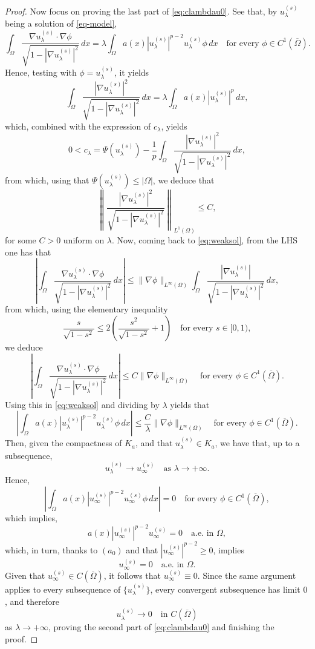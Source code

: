 \documentclass[11pt,reqno]{amsart}
\theoremstyle{plain}
\theoremstyle{definition}
\numberwithin{equation}{section}
\begin{document}
\begin{proof}
    \medskip
    Now focus on proving the last part of \eqref{eq:clambdau0}. See that, by $u_\lambda^{(s)}$ being a solution of \eqref{eq-model}, 
    \begin{equation} \label{eq:weaksol}\int_\Omega \frac{ \nabla u_\lambda^{(s)} \cdot \nabla \phi }{\sqrt{1 - |\nabla u_\lambda^{(s)}|^2}} \,dx = \lambda \int_{\Omega} a(x) |u_{\lambda}^{(s)}|^{p-2} u_\lambda^{(s)} \phi\, dx \quad \text{for every } \phi \in C^1(\overline\Omega).\end{equation}
    Hence, testing with $\phi = u_{\lambda}^{(s)}$, it yields
    $$\int_\Omega \frac{ |\nabla u_\lambda^{(s)}|^2  }{\sqrt{1 - |\nabla u_\lambda^{(s)}|^2}} \,dx = \lambda \int_{\Omega} a(x) |u_{\lambda}^{(s)}|^{p} \, dx, $$
    which, combined with the expression of $c_\lambda$, yields
    $$0<c_\lambda = \Psi(u_\lambda^{(s)}) - \frac{1}{p} \int_\Omega \frac{ |\nabla u_\lambda^{(s)}|^2  }{\sqrt{1 - |\nabla u_\lambda^{(s)}|^2}} \,dx, $$
    from which, using that $\Psi(u_\lambda^{(s)}) \leq| \Omega|$, we deduce that
    $$ \left \| \frac{ |\nabla u_\lambda^{(s)}|^2  }{\sqrt{1 - |\nabla u_\lambda^{(s)}|^2}} \right \|_{L^1(\Omega)} \leq C,$$
    for some $C>0$ uniform on $\lambda$. Now, coming back to \eqref{eq:weaksol}, from the LHS one has that
    $$\left | \int_\Omega \frac{\nabla u_\lambda^{(s)} \cdot \nabla \phi}{\sqrt{1-|\nabla u_\lambda^{(s)}|^2}} \, dx  \right | \leq \| \nabla \phi\|_{L^{\infty}(\Omega)}  \int_\Omega \frac{|\nabla u_\lambda^{(s)}|}{\sqrt{1-|\nabla u_\lambda^{(s)}|^2}} \, dx,  $$
    from which, using the elementary inequality
    $$\frac{s}{\sqrt{1-s^2}} \leq 2 \left( \frac{s^2}{\sqrt{1-s^2}} + 1 \right) \quad \text{for every } s\in[0,1),$$
    we deduce
    $$\left | \int_\Omega \frac{\nabla u_\lambda^{(s)} \cdot \nabla \phi}{\sqrt{1-|\nabla u_\lambda^{(s)}|^2}} \, dx  \right |  \leq C \|\nabla \phi\|_{L^{\infty}(\Omega)} \quad \text{for every } \phi \in C^1(\overline \Omega). $$
    Using this in \eqref{eq:weaksol} and dividing by $\lambda$ yields that
    $$\left | \int_\Omega a(x) |u_\lambda^{(s)}|^{p-2} u_\lambda^{(s)} \phi  \, dx\right | \leq \frac{C}{\lambda} \|\nabla \phi\|_{L^\infty(\Omega)} \quad \text{for every } \phi \in C^1(\overline \Omega).$$
    Then, given the compactness of $K_a$, and that $u_\lambda^{(s)} \in K_a$, we have that, up to a subsequence, $$u_\lambda^{(s)} \to u_\infty^{(s)} \quad \text{as } \lambda \to +\infty.$$
    Hence,
    $$\left | \int_\Omega a(x) |u_\infty^{(s)}|^{p-2} u_\infty^{(s)} \phi \, dx \right | = 0 \quad \text{for every } \phi \in C^1(\overline{\Omega}),$$
    which implies,
    $$ a(x) |u_\infty^{(s)}|^{p-2} u_\infty^{(s)} = 0 \quad \text{a.e. in } \Omega,$$
    which, in turn, thanks to $(a_0)$ and that $|u_\infty^{(s)}|^{p-2} \geq 0$, implies
    $$ u_\infty^{(s)} = 0 \quad \text{a.e. in } \Omega.$$
    Given that $u_\infty^{(s)} \in C(\overline{\Omega})$, it follows that $u_\infty^{(s)} \equiv 0$. Since the same argument applies to every subsequence of $\{u_\lambda^{(s)}\}$, every convergent subsequence has limit $0$, and therefore
    $$u_\lambda^{(s)}\rightarrow 0 \quad\text{in }C(\overline\Omega)$$
    as $\lambda\to+\infty$, proving the second part of \eqref{eq:clambdau0} and finishing the proof.
\end{proof}
\end{document}
